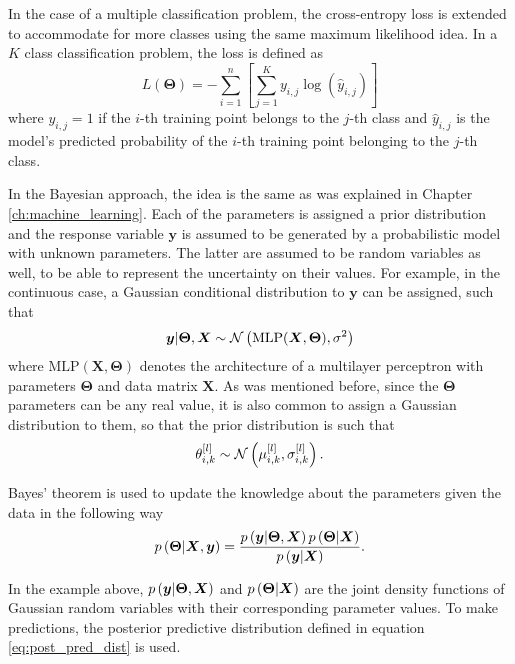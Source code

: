 In the case of a multiple classification problem, the cross-entropy loss is extended to accommodate for more classes using the same maximum likelihood idea. In a $K$ class classification problem, the loss is defined as
\begin{equation}
  L(\boldsymbol{\Theta}) = - \sum_{i = 1}^n \left[ \sum_{j = 1}^K y_{i,j} \log{\left( \hat{y}_{i,j} \right)}  \right]
\end{equation}
where $y_{i,j} = 1$ if the $i$-th training point belongs to the $j$-th class and $\hat{y}_{i,j}$ is the model's predicted probability of the $i$-th training point belonging to the $j$-th class.

In the Bayesian approach, the idea is the same as was explained in Chapter \ref{ch:machine_learning}. Each of the parameters is assigned a prior distribution and the response variable $\boldsymbol{y}$ is assumed to be generated by a probabilistic model with unknown parameters. The latter are assumed to be random variables as well, to be able to represent the uncertainty on their values. For example, in the continuous case, a Gaussian conditional distribution to $\boldsymbol{y}$ can be assigned, such that
\begin{equation}
  \boldsymbol{y} | \boldsymbol{\Theta}, \boldsymbol{X} \sim \mathcal{N}\left( \mathrm{MLP}(\boldsymbol{X}, \boldsymbol{\Theta}), \sigma^2 \right)
\end{equation}
where $\mathrm{MLP}(\boldsymbol{X}, \boldsymbol{\Theta})$ denotes the architecture of a multilayer perceptron with parameters $\boldsymbol{\Theta}$ and data matrix $\boldsymbol{X}$. As was mentioned before, since the $\boldsymbol{\Theta}$ parameters can be any real value, it is also common to assign a Gaussian distribution to them, so that the prior distribution is such that
\begin{equation}
  \theta_{i,k}^{[l]} \sim \mathcal{N}\left( \mu_{i,k}^{[l]}, \sigma_{i,k}^{[l]} \right).
\end{equation}

Bayes' theorem is used to update the knowledge about the parameters given the data in the following way
\begin{equation}
  p\left( \boldsymbol{\Theta} | \boldsymbol{X}, \boldsymbol{y} \right) = \frac{p\left( \boldsymbol{y} | \boldsymbol{\Theta}, \boldsymbol{X} \right) p\left( \boldsymbol{\Theta} | \boldsymbol{X} \right)}{p\left( \boldsymbol{y} | \boldsymbol{X} \right)}.
\end{equation}

In the example above, $p\left( \boldsymbol{y} | \boldsymbol{\Theta}, \boldsymbol{X} \right)$ and $p\left( \boldsymbol{\Theta} | \boldsymbol{X} \right)$ are the joint density functions of Gaussian random variables with their corresponding parameter values. To make predictions, the posterior predictive distribution defined in equation \eqref{eq:post_pred_dist} is used.

